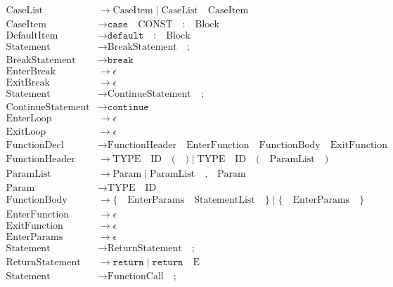 \documentclass[letterpaper,12pt,oneside]{article}
\begin{document}
\begin{align*}
\text{CaseList} &\rightarrow \text{CaseItem} \mid \text{CaseList} \quad \text{CaseItem} \\
\text{CaseItem} &\rightarrow \texttt{case} \quad \text{CONST} \quad \texttt{:} \quad \text{Block} \\
\text{DefaultItem} &\rightarrow \texttt{default} \quad \texttt{:} \quad \text{Block} \\
\text{Statement} &\rightarrow \text{BreakStatement} \quad \texttt{;} \\
\text{BreakStatement} &\rightarrow \texttt{break} \\
\text{EnterBreak} &\rightarrow \epsilon \\
\text{ExitBreak} &\rightarrow \epsilon \\
\text{Statement} &\rightarrow \text{ContinueStatement} \quad \texttt{;} \\
\text{ContinueStatement} &\rightarrow \texttt{continue} \\
\text{EnterLoop} &\rightarrow \epsilon \\
\text{ExitLoop} &\rightarrow \epsilon \\
\text{FunctionDecl} &\rightarrow \text{FunctionHeader} \quad \text{EnterFunction} \quad \text{FunctionBody} \quad \text{ExitFunction} \\
\text{FunctionHeader} &\rightarrow \text{TYPE} \quad \text{ID} \quad \texttt{(} \quad \texttt{)} \mid \text{TYPE} \quad \text{ID} \quad \texttt{(} \quad \text{ParamList} \quad \texttt{)} \\
\text{ParamList} &\rightarrow \text{Param} \mid \text{ParamList} \quad \texttt{,} \quad \text{Param} \\
\text{Param} &\rightarrow \text{TYPE} \quad \text{ID} \\
\text{FunctionBody} &\rightarrow \texttt{\{} \quad \text{EnterParams} \quad \text{StatementList} \quad \texttt{\}} \mid \texttt{\{} \quad \text{EnterParams} \quad \texttt{\}} \\
\text{EnterFunction} &\rightarrow \epsilon \\
\text{ExitFunction} &\rightarrow \epsilon \\
\text{EnterParams} &\rightarrow \epsilon \\
\text{Statement} &\rightarrow \text{ReturnStatement} \quad \texttt{;} \\
\text{ReturnStatement} &\rightarrow \texttt{return} \mid \texttt{return} \quad \text{E} \\
\text{Statement} &\rightarrow \text{FunctionCall} \quad \texttt{;} \\

\end{align*}
\end{document}
